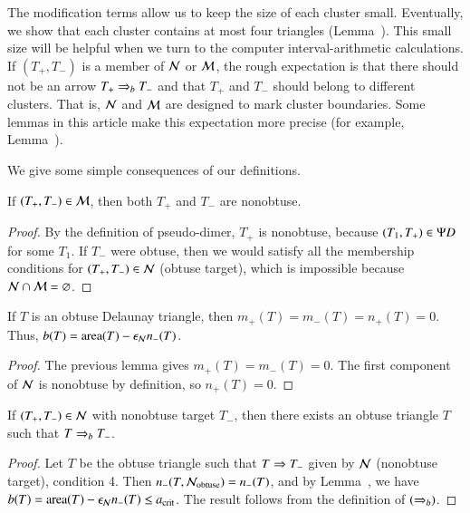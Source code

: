 The modification terms allow us to keep the size of each cluster small.
Eventually, we show that each cluster contains at most four triangles
(Lemma~).  This small size will be helpful when we
turn to the computer interval-arithmetic calculations.  If $(T_+,T_-)$ is a member of $\mathcal N$
or $\mathcal M$, the rough expectation is that there should not be an arrow
$T_+\Rightarrow_{b} T_-$ and that $T_+$ and $T_-$ should belong to different
clusters.  That is, $\mathcal N$ and $\mathcal M$ are designed to mark cluster
boundaries.  Some lemmas in this article make this expectation more
precise (for example, Lemma~).

We give some simple consequences of our definitions.

\begin{lemma}
  If $(T_+,T_-)\in \mathcal M$, then both $T_+$ and $T_-$ are nonobtuse.
\end{lemma}

\begin{proof} 
  By the definition of pseudo-dimer, $T_+$ is nonobtuse, because
  $(T_1,T_+)\in\Psi D$ for some $T_1$.  If $T_-$ were obtuse, then we
  would satisfy all the membership conditions for $(T_+,T_-)\in \mathcal N$
  (obtuse target), which is impossible because $\mathcal N\cap \mathcal M =
  \varnothing$.
\end{proof}

\begin{lemma}[obtuse $b$] 
  If $T$ is an obtuse Delaunay triangle, then
  $m_+(T)=m_-(T)=n_+(T)=0$.  Thus, $b(T) = {\operatorname{area}}(T) - \epsilon_{\mathcal N} n_-(T)$.
\end{lemma}

\begin{proof} 
  The previous lemma gives $m_+(T)=m_-(T)=0$.  The first component of
  $\mathcal N$ is nonobtuse by definition, so $n_+(T)=0$.
\end{proof}

\begin{corollary} 
  If $(T_+,T_-)\in\mathcal N$ with nonobtuse target $T_-$, then there exists
  an obtuse triangle $T$ such that $T\Rightarrow_{b} T_-$.
\end{corollary}

\begin{proof} 
  Let $T$ be the obtuse triangle such that $T\Rightarrow T_-$ given by $\mathcal N$
  (nonobtuse target), condition 4.  Then $n_-(T,\mathcal N_{\text{obtuse}}) =
  n_-(T)$, and by Lemma~, we have $b(T) =
  {\operatorname{area}}(T)-\epsilon_{\mathcal N} n_-(T)\le a_\text{crit}$.  The result follows from the
  definition of $(\Rightarrow_{b})$.
\end{proof}

